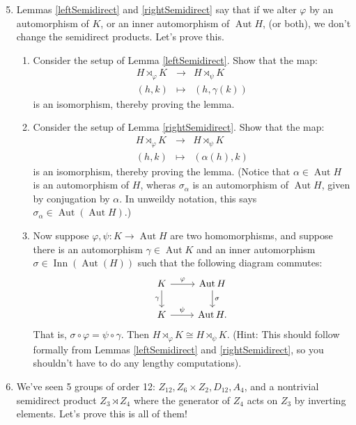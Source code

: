 \documentclass[11pt]{article}
\newcommand{\Aut}{\operatorname{Aut}}
\newcommand{\Inn}{\operatorname{Inn}}
\begin{document}
\begin{enumerate}
  \setcounter{enumi}{4}
  \item{Lemmas \ref{leftSemidirect} and \ref{rightSemidirect} say that if we alter $\varphi$ by an automorphism of $K$, or an inner automorphism of $\Aut H$, (or both), we don't change the semidirect products.  Let's prove this.
  \begin{enumerate}
    \item{
    Consider the setup of Lemma \ref{leftSemidirect}.  Show that the map:
    \begin{eqnarray*}
      H\rtimes_\varphi K&\longrightarrow& H\rtimes_\psi K\\
      (h,k)&\mapsto&(h,\gamma(k))
    \end{eqnarray*}
    is an isomorphism, thereby proving the lemma.
    }
    \item{
    Consider the setup of Lemma \ref{rightSemidirect}.  Show that the map:
    \begin{eqnarray*}
      H\rtimes_\varphi K&\longrightarrow&H\rtimes_\psi K\\
      (h,k) &\mapsto& (\alpha(h),k)
    \end{eqnarray*}
    is an isomorphism, thereby proving the lemma.  (Notice that $\alpha\in\Aut H$ is an automorphism of $H$, wheras $\sigma_\alpha$ is an automorphism of $\Aut H$, given by conjugation by $\alpha$.  In unweildy notation, this says $\sigma_\alpha\in\Aut(\Aut H)$.)
    }
    \item{
    Now suppose $\varphi,\psi:K\to\Aut H$ are two homomorphisms, and suppose there is an automorphism $\gamma\in\Aut K$ and an inner automorphism $\sigma\in\Inn(\Aut(H))$ such that the following diagram commutes:
    \[
    \begin{tikzcd}
      K\ar[r,"\varphi"]\ar[d,swap,"\gamma"]&\Aut H\ar[d,"\sigma"]\\
      K\ar[r,"\psi"]&\Aut H.
    \end{tikzcd}
    \]
    That is, $\sigma\circ\varphi = \psi\circ\gamma$.  Then $H\rtimes_\varphi K\cong H\rtimes_\psi K$.  (Hint: This should follow formally from Lemmas \ref{leftSemidirect} and \ref{rightSemidirect}, so you shouldn't have to do any lengthy computations).
    }
  \end{enumerate}
  }
  \item We've seen 5 groups of order 12: $Z_{12},Z_6\times Z_2, D_{12},A_4$, and a nontrivial semidirect product $Z_3\rtimes Z_4$ where the generator of $Z_4$ acts on $Z_3$ by inverting elements.  Let's prove this is all of them!

\end{enumerate}
\end{document}
